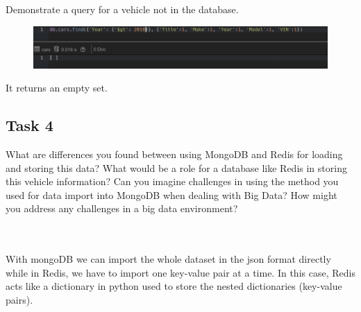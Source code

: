 \documentclass[11pt]{article}
\makeatletter
\def\maxwidth{\ifdim\Gin@nat@width>\linewidth\linewidth
    \else\Gin@nat@width\fi}
\let\Oldincludegraphics\includegraphics
\renewcommand{\includegraphics}[1]{\Oldincludegraphics[width=.8\maxwidth]{#1}}
\makeatother
\begin{document}
Demonstrate a query for a vehicle not in the database.

    \begin{figure}[H]
\centering
\includegraphics{4.png}
\caption{}
\end{figure}

It returns an empty set.

    \subsection*{Task 4}\label{task-4}

What are differences you found between using MongoDB and Redis for
loading and storing this data? What would be a role for a database like
Redis in storing this vehicle information? Can you imagine challenges in
using the method you used for data import into MongoDB when dealing with
Big Data? How might you address any challenges in a big data
environment?\\\\\

    With mongoDB we can import the whole dataset in the json format directly
while in Redis, we have to import one key-value pair at a time. In this
case, Redis acts like a dictionary in python used to store the nested
dictionaries (key-value pairs).
\end{document}
